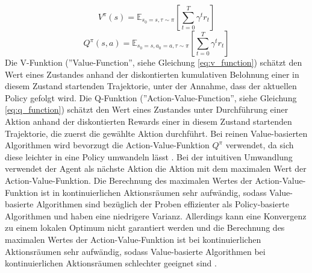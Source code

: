 \begin{equation}
    V^\pi (s)=\mathbb{E}_{s_0=s, \tau \sim \pi} \left[ \sum_{t=0}^T \gamma^t r_t \right]
    \label{eq:v_function}
\end{equation}
\begin{equation}
    Q^\pi (s,a) = \mathbb{E}_{s_0=s,a_0=a,\tau\sim\pi} \left[ \sum_{t=0}^T \gamma^t r_t\right]
    \label{eq:q_function}
\end{equation}
Die V-Funktion (''Value-Function'', siehe Gleichung \ref{eq:v_function}) schätzt den Wert eines Zustandes anhand der diskontierten kumulativen Belohnung einer in diesem Zustand startenden Trajektorie, unter der Annahme, dass der aktuellen Policy gefolgt wird. 
Die Q-Funktion (''Action-Value-Function'', siehe Gleichung \ref{eq:q_function}) schätzt den Wert eines Zustandes unter Durchführung einer Aktion anhand der diskontierten Rewards einer in diesem Zustand startenden Trajektorie, die zuerst die gewählte Aktion durchführt. 
Bei reinen Value-basierten Algorithmen wird bevorzugt die Action-Value-Funktion $Q^\pi$ verwendet, da sich diese leichter in eine Policy umwandeln lässt \cite{FoundationsDeepRL}. Bei der intuitiven Umwandlung verwendet der Agent als nächste Aktion die Aktion mit dem maximalen Wert der Action-Value-Funktion. Die Berechnung des maximalen Wertes der Action-Value-Funktion ist in kontinuierlichen Aktionsräumen sehr aufwändig, sodass 
Value-basierte Algorithmen sind bezüglich der Proben effizienter als Policy-basierte Algorithmen und haben eine niedrigere Varianz. Allerdings kann eine Konvergenz zu einem lokalen Optimum nicht garantiert werden und die Berechnung des maximalen Wertes der Action-Value-Funktion ist bei kontinuierlichen Aktionsräumen sehr aufwändig, sodass Value-basierte Algorithmen bei kontinuierlichen Aktionsräumen schlechter geeignet sind \cite{grokking}.

